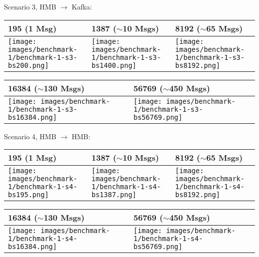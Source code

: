 \newpage
Scenario 3, HMB $\rightarrow$ Kafka:

\begin{table}[H]
\centering
\begin{tabular}{|l|l|l|} \hline
195 (1 Msg) & 1387 ($\sim$10 Msgs)& 8192 ($\sim$65 Msgs)\\ \hline
\texttt{[image: images/benchmark-1/benchmark-1-s3-bs200.png]}
&
\texttt{[image: images/benchmark-1/benchmark-1-s3-bs1400.png]}
&
\texttt{[image: images/benchmark-1/benchmark-1-s3-bs8192.png]} \\ \hline
\end{tabular}
\end{table}

\begin{table}[H]
\centering
\begin{tabular}{|l|l|} \hline
16384 ($\sim$130 Msgs)& 56769 ($\sim$450 Msgs)\\ \hline
\texttt{[image: images/benchmark-1/benchmark-1-s3-bs16384.png]}
&
\texttt{[image: images/benchmark-1/benchmark-1-s3-bs56769.png]} \\ \hline
\end{tabular}
\end{table}

Scenario 4, HMB $\rightarrow$ HMB:

\begin{table}[H]
\centering
\begin{tabular}{|l|l|l|} \hline
195 (1 Msg) & 1387 ($\sim$10 Msgs)& 8192 ($\sim$65 Msgs)\\ \hline
\texttt{[image: images/benchmark-1/benchmark-1-s4-bs195.png]}
&
\texttt{[image: images/benchmark-1/benchmark-1-s4-bs1387.png]}
&
\texttt{[image: images/benchmark-1/benchmark-1-s4-bs8192.png]} \\ \hline
\end{tabular}
\end{table}

\begin{table}[H]
\centering
\begin{tabular}{|l|l|} \hline
16384 ($\sim$130 Msgs)& 56769 ($\sim$450 Msgs)\\ \hline
\texttt{[image: images/benchmark-1/benchmark-1-s4-bs16384.png]}
&
\texttt{[image: images/benchmark-1/benchmark-1-s4-bs56769.png]} \\ \hline
\end{tabular}
\end{table}

